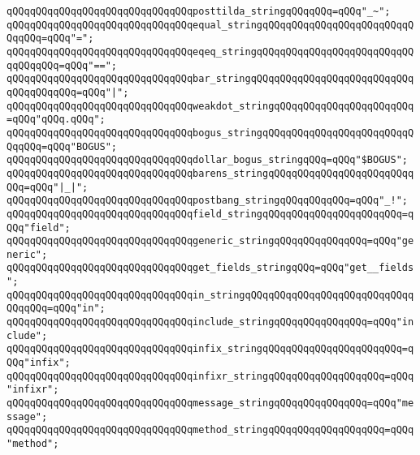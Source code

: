 \verb|qQQqqQQqqQQqqQQqqQQqqQQqqQQqqQQqposttilda_stringqQQqqQQq=qQQq"_~";|\newline
\newline
\verb|qQQqqQQqqQQqqQQqqQQqqQQqqQQqqQQqequal_stringqQQqqQQqqQQqqQQqqQQqqQQqqQQqqQQq=qQQq"=";|\newline
\verb|qQQqqQQqqQQqqQQqqQQqqQQqqQQqqQQqeqeq_stringqQQqqQQqqQQqqQQqqQQqqQQqqQQqqQQqqQQq=qQQq"==";|\newline
\verb|qQQqqQQqqQQqqQQqqQQqqQQqqQQqqQQqbar_stringqQQqqQQqqQQqqQQqqQQqqQQqqQQqqQQqqQQqqQQq=qQQq"|\verb#|";#\newline
\verb|qQQqqQQqqQQqqQQqqQQqqQQqqQQqqQQqweakdot_stringqQQqqQQqqQQqqQQqqQQqqQQq=qQQq"qQQq.qQQq";|\newline
\verb|qQQqqQQqqQQqqQQqqQQqqQQqqQQqqQQqbogus_stringqQQqqQQqqQQqqQQqqQQqqQQqqQQqqQQq=qQQq"BOGUS";|\newline
\verb|qQQqqQQqqQQqqQQqqQQqqQQqqQQqqQQqdollar_bogus_stringqQQq=qQQq"$BOGUS";|\newline
\verb|qQQqqQQqqQQqqQQqqQQqqQQqqQQqqQQqbarens_stringqQQqqQQqqQQqqQQqqQQqqQQqqQQq=qQQq"|\verb#|_|";#\newline
\newline
\verb|qQQqqQQqqQQqqQQqqQQqqQQqqQQqqQQqpostbang_stringqQQqqQQqqQQq=qQQq"_!";|\newline
\newline
\verb|qQQqqQQqqQQqqQQqqQQqqQQqqQQqqQQqfield_stringqQQqqQQqqQQqqQQqqQQqqQQq=qQQq"field";|\newline
\verb|qQQqqQQqqQQqqQQqqQQqqQQqqQQqqQQqgeneric_stringqQQqqQQqqQQqqQQq=qQQq"generic";|\newline
\verb|qQQqqQQqqQQqqQQqqQQqqQQqqQQqqQQqget_fields_stringqQQq=qQQq"get__fields";|\newline
\verb|qQQqqQQqqQQqqQQqqQQqqQQqqQQqqQQqin_stringqQQqqQQqqQQqqQQqqQQqqQQqqQQqqQQqqQQq=qQQq"in";|\newline
\verb|qQQqqQQqqQQqqQQqqQQqqQQqqQQqqQQqinclude_stringqQQqqQQqqQQqqQQq=qQQq"include";|\newline
\verb|qQQqqQQqqQQqqQQqqQQqqQQqqQQqqQQqinfix_stringqQQqqQQqqQQqqQQqqQQqqQQq=qQQq"infix";|\newline
\verb|qQQqqQQqqQQqqQQqqQQqqQQqqQQqqQQqinfixr_stringqQQqqQQqqQQqqQQqqQQq=qQQq"infixr";|\newline
\verb|qQQqqQQqqQQqqQQqqQQqqQQqqQQqqQQqmessage_stringqQQqqQQqqQQqqQQq=qQQq"message";|\newline
\verb|qQQqqQQqqQQqqQQqqQQqqQQqqQQqqQQqmethod_stringqQQqqQQqqQQqqQQqqQQq=qQQq"method";|\newline
